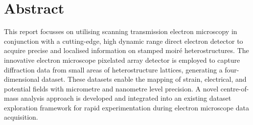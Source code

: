 \chapter*{Abstract}
This report focusses on utilising scanning transmission electron microscopy in conjunction with a cutting-edge, high dynamic range direct electron detector to acquire precise and localised information on stamped moiré heterostructures. The innovative electron microscope pixelated array detector is employed to capture diffraction data from small areas of heterostructure lattices, generating a four-dimensional dataset. These datasets enable the mapping of strain, electrical, and potential fields with micrometre and nanometre level precision. A novel centre-of-mass analysis approach is developed and integrated into an existing dataset exploration framework for rapid experimentation during electron microscope data acquisition.
